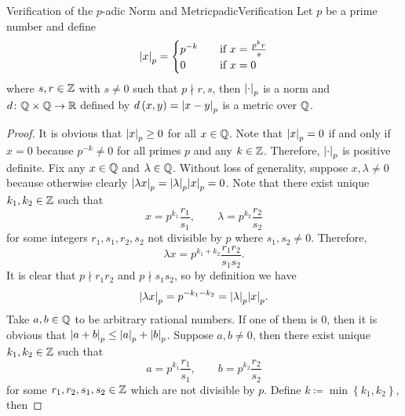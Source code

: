 \documentclass[math]{amznotes}
\theoremstyle{remark}
\begin{document}
\begin{probox}{Verification of the $p$-adic Norm and Metric}{padicVerification}
    Let $p$ be a prime number and define 
    \begin{equation*}
        {\left\lvert {x} \right\rvert}_p = \begin{cases}
            p^{-k} & \quad\textrm{if } x = \frac{p^kr}{s} \\
            0 & \quad\textrm{if } x = 0
        \end{cases}
    \end{equation*}
    where $s, r \in \mathbb{Z}$ with $s \neq 0$ such that $p \nmid r, s$, then ${\left\lvert {\cdot} \right\rvert}_p$ is a norm and $d \colon \mathbb{Q} \times \mathbb{Q} \to \mathbb{R}$ defined by $d\left(x, y\right) = {\left\lvert {x - y} \right\rvert}_p$ is a metric over $\mathbb{Q}$.
    \tcblower
    \begin{proof}
        It is obvious that ${\left\lvert {x} \right\rvert}_p \geq 0$ for all $x \in \mathbb{Q}$. Note that ${\left\lvert {x} \right\rvert}_p = 0$ if and only if $x = 0$ because $p^{-k} \neq 0$ for all primes $p$ and any $k \in \mathbb{Z}$. Therefore, ${\left\lvert {\cdot} \right\rvert}_p$ is positive definite. Fix any $x \in \mathbb{Q}$ and $\lambda \in \mathbb{Q}$. Without loss of generality, suppose $x, \lambda \neq 0$ because otherwise clearly ${\left\lvert {\lambda x} \right\rvert}_p = {\left\lvert {\lambda} \right\rvert}_p{\left\lvert {x} \right\rvert}_p = 0$. Note that there exist unique $k_1, k_2 \in \mathbb{Z}$ such that 
        \begin{equation*}
            x = p^{k_1}\frac{r_1}{s_1}, \qquad\lambda = p^{k_2}\frac{r_2}{s_2}
        \end{equation*}
        for some integers $r_1, s_1, r_2, s_2$ not divisible by $p$ where $s_1, s_2 \neq 0$. Therefore, 
        \begin{equation*}
            \lambda x = p^{k_1 + k_2}\frac{r_1r_2}{s_1s_2}.
        \end{equation*}
        It is clear that $p \nmid r_1r_2$ and $p \nmid s_1s_2$, so by definition we have 
        \begin{equation*}
            {\left\lvert {\lambda x} \right\rvert}_p = p^{-k_1 - k_2} = {\left\lvert {\lambda} \right\rvert}_p{\left\lvert {x} \right\rvert}_p.
        \end{equation*}
        Take $a, b\in \mathbb{Q}$ to be arbitrary rational numbers. If one of them is $0$, then it is obvious that ${\left\lvert {a + b} \right\rvert}_p \leq {\left\lvert {a} \right\rvert}_p + {\left\lvert {b} \right\rvert}_p$. Suppose $a, b \neq 0$, then there exist unique $k_1, k_2 \in \mathbb{Z}$ such that 
        \begin{equation*}
            a = p^{k_1}\frac{r_1}{s_1}, \qquad b = p^{k_2}\frac{r_2}{s_2}
        \end{equation*}
        for some $r_1, r_2, s_1, s_2 \in \mathbb{Z}$ which are not divisible by $p$. Define $k \coloneqq \min\left\{k_1, k_2\right\}$, then  

\end{proof}
\end{probox}
\end{document}
